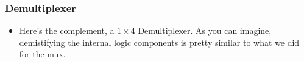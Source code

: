 \documentclass{beamer}
\begin{document}
			\begin{frame}
				\frametitle{Demultiplexer}
				
				\begin{itemize}
					\item Here's the complement, a $1 \times 4$ Demultiplexer. As you can imagine, demistifying the internal logic components is pretty similar to what we did for the mux.
				\end{itemize}
				
				\centering
				
				


\begin{tikzpicture}[x=0.75pt,y=0.75pt,yscale=-1,xscale=1]


\end{tikzpicture}
\end{frame}
\end{document}
